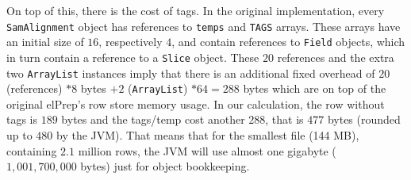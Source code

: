 \documentclass[a4paper,twoside]{article}
\begin{document}
%
%
%
%
%
%

On top of this, there is the cost of tags.
In the original implementation, every {\texttt{SamAlignment}} object has references to {\texttt{temps}} and {\texttt{TAGS}} arrays.
These arrays have an initial size of $16$, respectively $4$, and contain references to {\texttt{Field}} objects, which in turn contain a reference to a {\texttt{Slice}} object.
These $20$ references and the extra two \texttt{ArrayList} instances imply that there is an additional fixed overhead of $20$ (references) $*8$ bytes $+ 2$ (\texttt{ArrayList}) $* 64 = 288$ bytes which are on top of the original elPrep's row store memory usage.
In our calculation, the row without tags is $189$ bytes and the tags/temp cost another $288$,
that is $477$ bytes (rounded up to $480$ by the JVM).
That means that for the smallest file (144 MB), containing $2.1$ million rows, the JVM will use almost one gigabyte ($1,001,700,000$ bytes) just for object bookkeeping.
\end{document}
